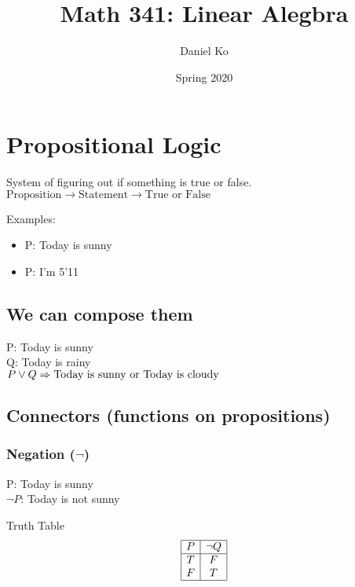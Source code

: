 \documentclass[11pt]{scrartcl}
\title{Math 341: Linear Alegbra}
\author{Daniel Ko}
\date{Spring 2020}
\begin{document}
\maketitle


\section{Propositional Logic}

System of figuring out if something is true or false.
\\
$\text{Proposition} \rightarrow \text{Statement} \rightarrow \text{True or False}$

Examples:
\begin{itemize}
	\item P: Today is sunny 
	\item P: I'm 5'11
\end{itemize}

\subsection{We can compose them}
P: Today is sunny
\\
Q: Today is rainy
\\
$P \lor Q \Rightarrow \hbox{Today is sunny or Today is cloudy}$

\subsection{Connectors (functions on propositions)}

\subsubsection{Negation ($\lnot$)}

P: Today is sunny
\\
$\lnot P$: Today is not sunny

\begin{center}
	Truth Table
	\begin{displaymath}
		\begin{array}{|c|c|}
			\hline
			P & \lnot Q \\ 
			\hline
			T & F \\
			F & T \\
			\hline
		\end{array}
	\end{displaymath}
\end{center}
\end{document}
